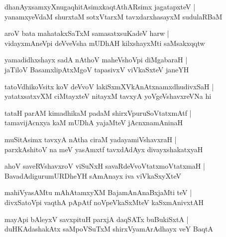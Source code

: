 \documentclass[twoside,12pt,openright]{book}
\newcounter{shloka}[chapter]
\begin{document}
\begin{shloka}%
dhanAyxsamxyXnugaqhitAsimxkaqtAthARsimx jagatapxteV |\\
yanamxyeVdaM shurxtaM sotxVtarxM tavxdarxhasayxM sudulaRBaM 
\end{shloka}

\begin{shloka}%
aroV bata mahatakxSaTxM samasatxsuKadeV harw |\\
vidayxmAneVpi deVveVsha mUDhAH kilxshayxMti saMsakxqqtw 
\end{shloka}

\begin{shloka}%
yamadidhxshayx sadA nAthoV maheVshoVpi diMgabaraH |\\
jaTiloV BasamxlipAtxMgoV tapasivxV viVkaSxteV janeYH
\end{shloka}

\begin{shloka}%
tatoVdhikoVsitx koV deVvoV lakiSxmXVkAnAtxnamxdhudivxSaH |\\
yatatxsatxvXM ciMtayxteV nitayxM tavxyA yoVgeVshavxreVNa hi
\end{shloka}

\begin{shloka}%
tataH parAM kimadhikaM padaM shirxVpuruSoVtatxmAtf |\\
tamavijAcnxya kaM mUDhA yajaMteV jAcnxnamAninaH 
\end{shloka}

\begin{shloka}%
muSitAsimx tavxyA nAtha ciraM yadayamiVshavxraH |\\
parxkAshitoV na meV yasAmxtf tavxdAdAyx divayxshakatxyaH 
\end{shloka}

\begin{shloka}%
ahoV saveRVshavxroV viSuNxH savaRdeVvoVtatxmoVtatxmaH |\\
BavadAdigurumURDheYH sAmAnayx iva viVkaSxyXteV 
\end{shloka}

\begin{shloka}%
mahiVyasAMtu mAhAtamxyXM BajamAnAnaBxjaMti teV |\\
divxSatoVpi vaqthA pApAtf noVpeVkaSxMteV kaSxmAnivxtAH 
\end{shloka}

\begin{shloka}%
mayApi bAleyxV savxpituH parxjA daqSATx buBukiSxtA |\\
duHKAdashakAtx saMpoVSuTxM shirxVyamArAdhayx veY BaqtA
\end{shloka}
\end{document}
